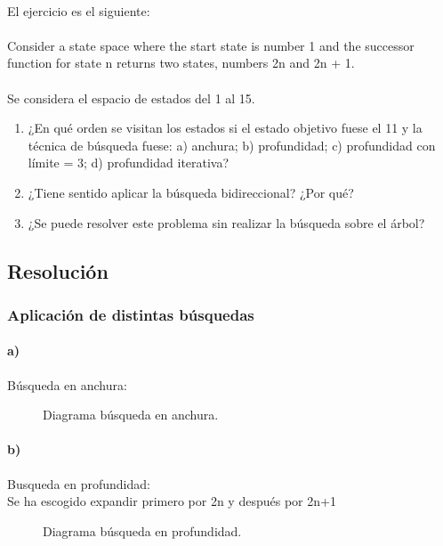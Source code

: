 \documentclass[a4paper,10pt]{article}
\newcommand\tab[1][1cm]{\hspace*{#1}}
\begin{document}
\paragraph{}
El ejercicio es el siguiente:
\paragraph{}
Consider a state space where the start state is number 1 and the successor function for
state n returns two states, numbers 2n and 2n + 1.
\paragraph{}
Se considera el espacio de estados del 1 al 15.


\begin{enumerate}
  \item ¿En qué orden se visitan los estados si el estado objetivo fuese el 11 y la técnica de búsqueda fuese: a) anchura; b) profundidad; c) profundidad con límite = 3; d) profundidad iterativa?
  \item ¿Tiene sentido aplicar la búsqueda bidireccional? ¿Por qué?
  \item ¿Se puede resolver este problema sin realizar la búsqueda sobre el árbol?
\end{enumerate}


\subsection{Resolución}
\subsubsection{Aplicación de distintas búsquedas}
\paragraph{a)}Búsqueda en anchura:
\begin{figure}[hbt]
  \centering
	\scalebox{0.6}{}
	\caption{Diagrama búsqueda en anchura.}
	\label{fig:busqueda_anchura}
\end{figure}
\pagebreak

\paragraph{b)}Busqueda en profundidad:\\
\tab Se ha escogido expandir primero por 2n y después por 2n+1
\begin{figure}[hbt]
  \centering
	\scalebox{0.7}{}
	\caption{Diagrama búsqueda en profundidad.}
	\label{fig:busqueda_profundidad}
\end{figure}
\end{document}
